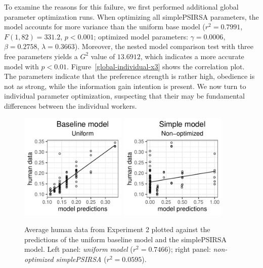 \documentclass[11pt,a4paper]{article}
\begin{document}
To examine the reasons for this failure, we first performed additional global parameter optimization runs.
When optimizing all simplePSIRSA parameters, the model accounts for more variance than the uniform base model ($r^2=0.7991$, $F(1,82) = 331.2$, $p<0.001$; optimized model parameters: $\gamma=0.0006$, $\beta=0.2758$, $\lambda=0.3663$).
Moreover, the nested model comparison test with three free parameters yields a $G^2$ value of $13.6912$, which indicates a more accurate model with $p<0.01$. 
Figure~\ref{global-individual-x3} shows the correlation plot. 
The parameters indicate that the preference strength is rather high, obedience is not as strong, while the information gain intention is present. 
We now turn to individual parameter optimization, suspecting that their may be fundamental differences between the individual workers. 




\begin{figure}[ht]
	\centering
	\includegraphics[width=2in]{images/x3_m20.pdf}
	\includegraphics[width=2in]{images/x3_m7.pdf}
	\caption{Average human data from Experiment 2 plotted against the predictions of the uniform baseline model and the simplePSIRSA model. 
		Left panel: \emph{uniform model} ($r^{2}=0.7466$);
		right panel: \emph{non-optimized simplePSIRSA} ($r^2=0.0595$).
	}
	\label{base-nonopt-x3}
\end{figure}
\end{document}
